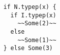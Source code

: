 \begin{lstlisting}[style=scalaioScala]
if N.typep(x) {
  if I.typep(x)
    ~~Some(2)~~
  else
    ~~Some(1)~~
} else Some(3)
\end{lstlisting}
